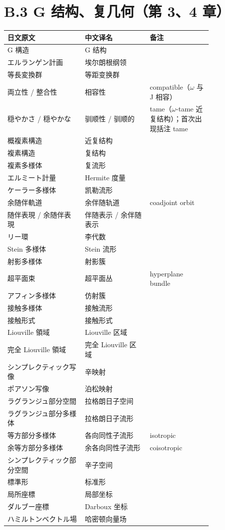 \section*{B.3 G 结构、复几何（第 3、4 章）}
{\small
\begin{longtable}{p{0.31\linewidth} p{0.26\linewidth} p{0.25\linewidth}}
\toprule
日文原文 & 中文译名 & 备注 \\
\midrule
\endhead
G 構造 & G 结构 &  \\
エルランゲン計画 & 埃尔朗根纲领 &  \\
等長変換群 & 等距变换群 &  \\
両立性 / 整合性 & 相容性 & compatible（$\omega$ 与 J 相容） \\
穏やかさ / 穏やかな & 驯顺性 / 驯顺的 & tame（$\omega$-tame 近复结构）；首次出现括注 tame \\
概複素構造 & 近复结构 &  \\
複素構造 & 复结构 &  \\
複素多様体 & 复流形 &  \\
エルミート計量 & Hermite 度量 &  \\
ケーラー多様体 & 凯勒流形 &  \\
余随伴軌道 & 余伴随轨道 & coadjoint orbit \\
随伴表現 / 余随伴表現 & 伴随表示 / 余伴随表示 &  \\
リー環 & 李代数 &  \\
Stein 多様体 & Stein 流形 &  \\
射影多様体 & 射影簇 &  \\
超平面束 & 超平面丛 & hyperplane bundle \\
アフィン多様体 & 仿射簇 &  \\
接触多様体 & 接触流形 &  \\
接触形式 & 接触形式 &  \\
Liouville 領域 & Liouville 区域 &  \\
完全 Liouville 領域 & 完全 Liouville 区域 &  \\
シンプレクティック写像 & 辛映射 &  \\
ポアソン写像 & 泊松映射 &  \\
ラグランジュ部分空間 & 拉格朗日子空间 &  \\
ラグランジュ部分多様体 & 拉格朗日子流形 &  \\
等方部分多様体 & 各向同性子流形 & isotropic \\
余等方部分多様体 & 余各向同性子流形 & coisotropic \\
シンプレクティック部分空間 & 辛子空间 &  \\
標準形 & 标准形 &  \\
局所座標 & 局部坐标 &  \\
ダルブー座標 & Darboux 坐标 &  \\
ハミルトンベクトル場 & 哈密顿向量场 &  \\
\bottomrule
\end{longtable}
}

